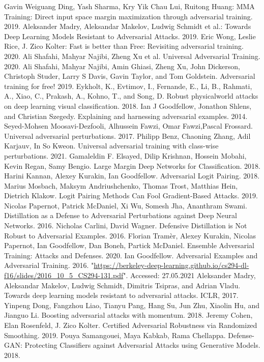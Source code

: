 \documentclass{article}
\begin{document}
\begin{thebibliography}{00}

     Gavin Weiguang Ding, Yash Sharma, Kry Yik Chau Lui, Ruitong Huang: MMA Training: Direct input space margin maximization through adversarial training. 2019.
     Aleksander Madry, Aleksandar Makelov, Ludwig Schmidt et al.: Towards Deep Learning Models Resistant to Adversarial Attacks. 2019.
     Eric Wong, Leslie Rice, J. Zico Kolter: Fast is better than Free: Revisiting adversarial training. 2020.
     Ali Shafahi, Mahyar Najibi, Zheng Xu et al. Universal Adversarial Training. 2020.
     Ali Shafahi, Mahyar Najibi, Amin Ghiasi, Zheng Xu, John Dickerson, Christoph Studer, Larry S Davis, Gavin Taylor, and Tom Goldstein. Adversarial training for free! 2019.
     Eykholt, K., Evtimov, I., Fernande, E., Li, B., Rahmati, A., Xiao, C., Prakash, A., Kohno, T., and Song, D. Robust physicalworld attacks on deep learning visual classification. 2018.
     Ian J Goodfellow, Jonathon Shlens, and Christian Szegedy. Explaining and harnessing adversarial examples. 2014.
     Seyed-Mohsen Moosavi-Dezfooli, Alhussein Fawzi, Omar Fawzi,Pascal Frossard. Universal adversarial perturbations. 2017.
     Philipp Benz, Chaoning Zhang, Adil Karjauv, In So Kweon. Universal adversarial training with class-wise perturbations. 2021.
     Gamaleldin F. Elsayed, Dilip Krishnan, Hossein Mobahi, Kevin Regan, Samy Bengio. Large Margin Deep Networks for Classification. 2018.
     Harini Kannan, Alexey Kurakin, Ian Goodfellow. Adversarial Logit Pairing. 2018.
     Marius Mosbach, Maksym Andriushchenko, Thomas Trost, Matthias Hein, Dietrich Klakow. Logit Pairing Methods Can Fool Gradient-Based Attacks. 2019.
     Nicolas Papernot, Patrick McDaniel, Xi Wu, Somesh Jha, Ananthram Swami. Distillation as a Defense to Adversarial Perturbations against Deep Neural Networks. 2016.
     Nicholas Carlini, David Wagner. Defensive Distillation is Not Robust to Adversarial Examples. 2016.
     Florian Tramèr, Alexey Kurakin, Nicolas Papernot, Ian Goodfellow, Dan Boneh, Partick McDaniel. Ensemble Adversarial Training: Attacks and Defenses. 2020.
     Ian Goodfellow. Adversarial Examples and Adversarial Training. 2016. "\url{https://berkeley-deep-learning.github.io/cs294-dl-f16/slides/2016_10_5_CS294-131.pdf}". Accessed: 27.05.2021
     Aleksander Madry, Aleksandar Makelov, Ludwig Schmidt, Dimitris Tsipras, and Adrian Vladu. Towards deep learning models resistant to adversarial attacks. ICLR, 2017.
     Yinpeng Dong, Fangzhou Liao, Tianyu Pang, Hang Su, Jun Zhu, Xiaolin Hu, and Jianguo Li. Boosting adversarial attacks with momentum. 2018.
     Jeremy Cohen, Elan Rosenfeld, J. Zico Kolter. Certified Adversarial Robustness via Randomized Smoothing. 2019.
     Pouya Samangouei, Maya Kabkab, Rama Chellappa. Defense-GAN: Protecting Classifiers against Adversarial Attacks using Generative Models. 2018.
  
  \end{thebibliography}
\end{document}
